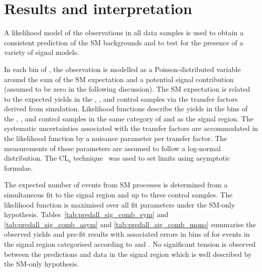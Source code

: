 \section{Results and interpretation}
\label{sec:interpretation}

A likelihood model of the observations in all data samples is
used to obtain a consistent prediction of the SM backgrounds and to
test for the presence of a variety of signal models.

In each bin of \scalht, the observation is modelled as a
Poisson-distributed variable around the sum of the SM expectation and a
potential signal contribution (assumed to be zero in the following
discussion). The SM expectation is related to the expected yields in
the \mj, \mmj, and \gj control samples via the transfer factors
derived from simulation. Likelihood functions describe the yields in the \scalht bins
of the \mj, \mmj, and \gj control samples in the same category of
\njet and \nb as the signal region. The systematic uncertainties
associated with the transfer factors are accommodated in the
likelihood function by a nuisance parameter per transfer factor. The
measurements of these parameters are assumed to follow a log-normal
distribution. The CL$_{\mathrm{s}}$ technique~\cite{read, Cowan:2010js} was used to set limits using asymptotic formulae.

The expected number of events from SM processes is determined from a
simultaneous fit to the signal region and up to three control
samples. The likelihood function is maximised over all fit parameters
under the SM-only hypothesis.
Tables~\ref{tab:predall_sig_comb_sym} and \ref{tab:predall_sig_comb_asym} and
\ref{tab:predall_sig_comb_mono} summarise
the observed yields and pre-fit results with associated errors in bins of \scalht for events in the signal region
categorised according to \njet and \nb. 
No significant tension is observed between the predictions and data in the
signal region which is well described by the SM-only hypothesis.




\clearpage


